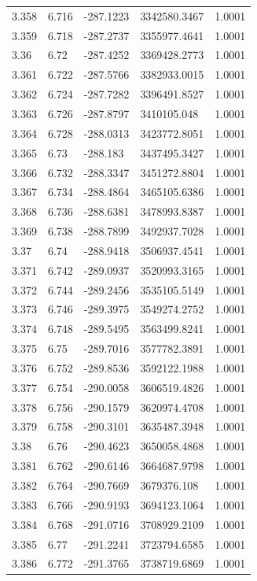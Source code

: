 \begin{tabular}{lllll}
3.358 & 6.716 & -287.1223 & 3342580.3467 & 1.0001 \\
3.359 & 6.718 & -287.2737 & 3355977.4641 & 1.0001 \\
3.36 & 6.72 & -287.4252 & 3369428.2773 & 1.0001 \\
3.361 & 6.722 & -287.5766 & 3382933.0015 & 1.0001 \\
3.362 & 6.724 & -287.7282 & 3396491.8527 & 1.0001 \\
3.363 & 6.726 & -287.8797 & 3410105.048 & 1.0001 \\
3.364 & 6.728 & -288.0313 & 3423772.8051 & 1.0001 \\
3.365 & 6.73 & -288.183 & 3437495.3427 & 1.0001 \\
3.366 & 6.732 & -288.3347 & 3451272.8804 & 1.0001 \\
3.367 & 6.734 & -288.4864 & 3465105.6386 & 1.0001 \\
3.368 & 6.736 & -288.6381 & 3478993.8387 & 1.0001 \\
3.369 & 6.738 & -288.7899 & 3492937.7028 & 1.0001 \\
3.37 & 6.74 & -288.9418 & 3506937.4541 & 1.0001 \\
3.371 & 6.742 & -289.0937 & 3520993.3165 & 1.0001 \\
3.372 & 6.744 & -289.2456 & 3535105.5149 & 1.0001 \\
3.373 & 6.746 & -289.3975 & 3549274.2752 & 1.0001 \\
3.374 & 6.748 & -289.5495 & 3563499.8241 & 1.0001 \\
3.375 & 6.75 & -289.7016 & 3577782.3891 & 1.0001 \\
3.376 & 6.752 & -289.8536 & 3592122.1988 & 1.0001 \\
3.377 & 6.754 & -290.0058 & 3606519.4826 & 1.0001 \\
3.378 & 6.756 & -290.1579 & 3620974.4708 & 1.0001 \\
3.379 & 6.758 & -290.3101 & 3635487.3948 & 1.0001 \\
3.38 & 6.76 & -290.4623 & 3650058.4868 & 1.0001 \\
3.381 & 6.762 & -290.6146 & 3664687.9798 & 1.0001 \\
3.382 & 6.764 & -290.7669 & 3679376.108 & 1.0001 \\
3.383 & 6.766 & -290.9193 & 3694123.1064 & 1.0001 \\
3.384 & 6.768 & -291.0716 & 3708929.2109 & 1.0001 \\
3.385 & 6.77 & -291.2241 & 3723794.6585 & 1.0001 \\
3.386 & 6.772 & -291.3765 & 3738719.6869 & 1.0001 \\

\end{tabular}
